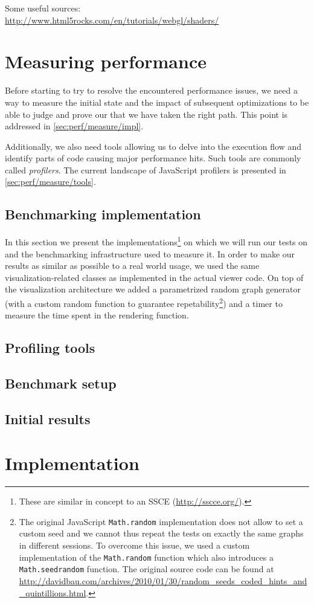Some useful sources:\\
\url{http://www.html5rocks.com/en/tutorials/webgl/shaders/}


\section{Measuring performance}

Before starting to try to resolve the encountered performance issues, we need a way to measure the initial state and the impact of subsequent optimizations to be able to judge and prove our that we have taken the right path. This point is addressed in \vref{sec:perf/measure/impl}.

Additionally, we also need tools allowing us to delve into the execution flow and identify parts of code causing major performance hits. Such tools are commonly called \textit{profilers}. The current landscape of JavaScript profilers is presented in \vref{sec:perf/measure/tools}.

\subsection{Benchmarking implementation}
\label{sec:perf/measure/impl}

In this section we present the implementations\footnote{These are similar in concept to an SSCE (\url{http://sscce.org/}).} on which we will run our tests on and the benchmarking infrastructure used to measure it. In order to make our results as similar as possible to a real world usage, we used the same visualization-related classes as implemented in the actual viewer code. On top of the visualization architecture we added a parametrized random graph generator (with a custom random function to guarantee repetability\footnote{The original JavaScript \texttt{Math.random} implementation does not allow to set a custom seed and we cannot thus repeat the tests on exactly the same graphs in different sessions. To overcome this issue, we used a custom implementation of the \texttt{Math.random} function which also introduces a \texttt{Math.seedrandom} function. The original source code can be found at \url{http://davidbau.com/archives/2010/01/30/random\_seeds\_coded\_hints\_and\_quintillions.html}.}) and a timer to measure the time spent in the rendering function.

\subsection{Profiling tools}
\label{sec:perf/measure/tools}

\subsection{Benchmark setup}



\subsection{Initial results}


\section{Implementation}
